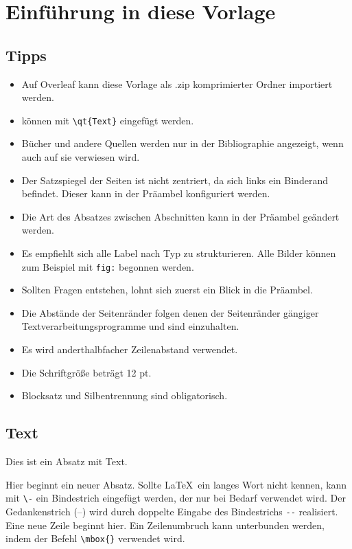 \chapter{Einführung in diese Vorlage}
\section{Tipps}
\begin{itemize}
 \item Auf Overleaf kann diese Vorlage als .zip komprimierter Ordner importiert werden.
 \item {} können mit \verb"\qt{Text}"
 eingefügt werden.
 \item Bücher und andere Quellen werden nur in der Bibliographie angezeigt, wenn auch auf sie verwiesen wird.
 \item Der Satzspiegel der Seiten ist nicht zentriert, da sich links ein Binderand befindet. Dieser kann in der Präambel konfiguriert werden.
 \item Die Art des Absatzes zwischen Abschnitten kann in der Präambel geändert werden.
 \item Es empfiehlt sich alle Label nach Typ zu strukturieren. Alle Bilder können zum Beispiel mit \texttt{fig:} begonnen werden.
 \item Sollten Fragen entstehen, lohnt sich zuerst ein Blick in die Präambel.
 \item Die Abstände der Seitenränder folgen denen der Seitenränder gängiger Textverarbeitungsprogramme und sind einzuhalten.
 \item Es wird anderthalbfacher Zeilenabstand verwendet.
 \item Die Schriftgröße beträgt 12 pt.
 \item Blocksatz und Silbentrennung sind obligatorisch.
\end{itemize}

\section{Text}
Dies ist ein Absatz mit Text.

Hier beginnt ein neuer Absatz. Sollte \LaTeX~ein langes Wort nicht kennen, kann mit \verb;\-; ein Bindestrich eingefügt werden, der nur bei Bedarf verwendet wird. 
Der Gedankenstrich (--) wird durch doppelte Eingabe des Bindestrichs \verb;--; realisiert.\\
Eine neue Zeile beginnt hier. Ein Zeilenumbruch kann unterbunden werden, indem der Befehl \verb;\mbox{}; verwendet wird.

